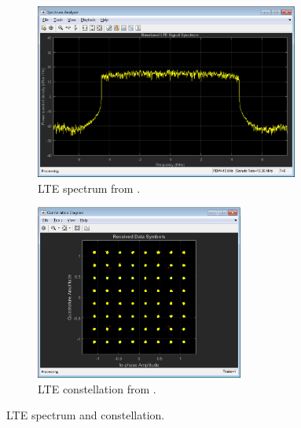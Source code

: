 \begin{figure}[htbp]
\centering
\begin{subfigure}{.5\textwidth}
  \centering
  \includegraphics[width=0.95\textwidth]{./figures/hsa}
  \caption{ LTE spectrum from \cite{web:lteexamplewiki}.
  \label{fig:ltespectrumiio}}
\end{subfigure}%
\begin{subfigure}{.5\textwidth}
  \centering
  \includegraphics[width=0.75\textwidth]{./figures/hcd}
  \caption{ LTE constellation from \cite{web:lteexamplewiki}.
  \label{fig:lteconstellationiio}}
\end{subfigure}
\caption{LTE spectrum and constellation.}
\label{fig:test}
\end{figure}

\newpage

